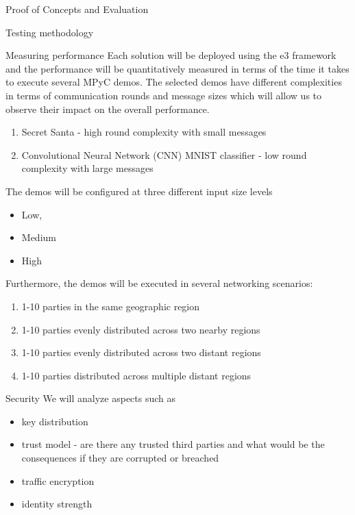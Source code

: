\begin{frame}{Proof of Concepts and Evaluation}
\begin{block}{Testing methodology}
\begin{block}{Measuring performance}
Each solution will be deployed using the \gls{e3} framework and the performance will be quantitatively measured in terms of the time it takes to execute several MPyC demos. The selected demos have different complexities in terms of communication rounds and message sizes which will allow us to observe their impact on the overall performance.

\begin{enumerate}
\tightlist
\item
  Secret Santa - high round complexity with small messages
\item
  Convolutional Neural Network (CNN) MNIST classifier - low round complexity with large messages
\end{enumerate}

The demos will be configured at three different input size levels

\begin{itemize}
\tightlist
\item
  Low,
\item
  Medium
\item
  High
\end{itemize}

Furthermore, the demos will be executed in several networking scenarios:

\begin{enumerate}
\tightlist
\item
  1-10 parties in the same geographic region
\item
  1-10 parties evenly distributed across two nearby regions
\item
  1-10 parties evenly distributed across two distant regions
\item
  1-10 parties distributed across multiple distant regions
\end{enumerate}
\end{block}

\begin{block}{Security}
\label{thesis__030-methods.md__security}
We will analyze aspects such as

\begin{itemize}
\tightlist
\item
  key distribution
\item
  trust model - are there any trusted third parties and what would be the consequences if they are corrupted or breached
\item
  traffic encryption
\item
  identity strength
\end{itemize}
\end{block}


\end{block}
\end{frame}
